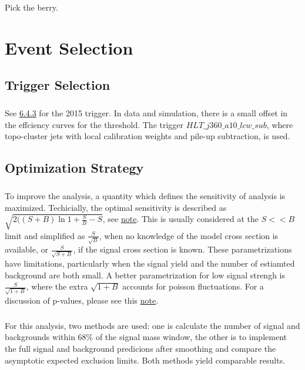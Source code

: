 \begin{savequote}[75mm]
Pick the berry.
\end{savequote}

\chapter{Event Selection}
\label{sec:selection}


\section{Trigger Selection}
\paragraph{}
See \href{https://arxiv.org/pdf/1611.09661.pdf}{6.4.3} for the 2015 trigger. In data and simulation, there is a small offset in the effciency curves for the threshold. The trigger $HLT\_j360\_a10\_lcw\_sub$, where topo-cluster jets with local calibration weights and pile-up subtraction, is used.


\section{Optimization Strategy}
\paragraph{}
To improve the analysis, a quantity which defines the sensitivity of analysis is maximized. Techicially, the optimal sensitivity is described as $\sqrt{2((S+B)\ln{1 + \frac{S}{B}} - S}$, see \href{https://www.pp.rhul.ac.uk/~cowan/stat/notes/SigCalcNote.pdf}{note}. This is usually considered at the $S << B$ limit and simplified as $\frac{S}{\sqrt{B}}$, when no knowledge of the model cross section is available, or $\frac{S}{\sqrt{S + B}}$, if the signal cross section is known. These parametrizations have limitations, particularly when the signal yield and the number of estiamted background are both small. A better parametrization for low signal strengh is $\frac{S}{\sqrt{1 + B}}$, where the extra $\sqrt{1 + B}$ accounts for poisson fluctuations. For a discussion of p-values, please see this \href{https://arxiv.org/pdf/hep-ex/0208005.pdf}{note}.

\paragraph{}
For this analysis, two methods are used: one is calculate the number of signal and backgrounds within $68\%$ of the signal \mhh mass window, the other is to implement the full signal and background predicions after smoothing and compare the asymptotic expected exclusion limits. Both methods yield comparable results.

